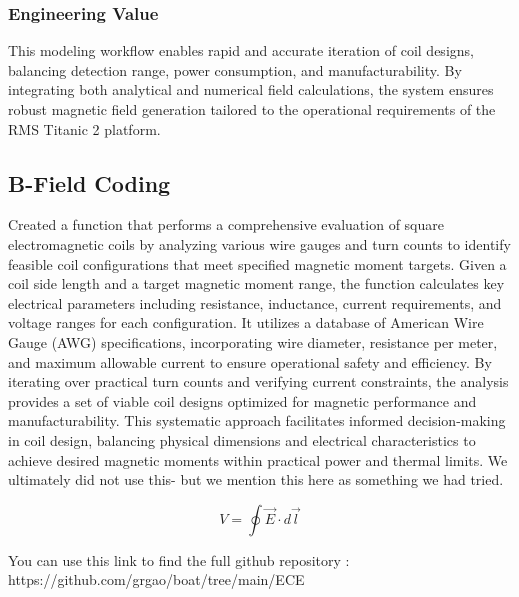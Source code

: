 \subsubsection{Engineering Value}
This modeling workflow enables rapid and accurate iteration of coil designs, balancing detection range, power consumption, and manufacturability. By integrating both analytical and numerical field calculations, the system ensures robust magnetic field generation tailored to the operational requirements of the RMS Titanic 2 platform.

\subsection{B-Field Coding}
Created a function that performs a comprehensive evaluation of square electromagnetic coils by analyzing various wire gauges and turn counts to identify feasible coil configurations that meet specified magnetic moment targets. Given a coil side length and a target magnetic moment range, the function calculates key electrical parameters including resistance, inductance, current requirements, and voltage ranges for each configuration. It utilizes a database of American Wire Gauge (AWG) specifications, incorporating wire diameter, resistance per meter, and maximum allowable current to ensure operational safety and efficiency. By iterating over practical turn counts and verifying current constraints, the analysis provides a set of viable coil designs optimized for magnetic performance and manufacturability. This systematic approach facilitates informed decision-making in coil design, balancing physical dimensions and electrical characteristics to achieve desired magnetic moments within practical power and thermal limits. We ultimately did not use this- but we mention this here as something we had tried.

\begin{equation}
V=\oint \overrightarrow{E}\cdot d\overrightarrow{l}  
\label{MyEquation}
\end{equation}

You can use this link to find the full github repository : https://github.com/grgao/boat/tree/main/ECE%



